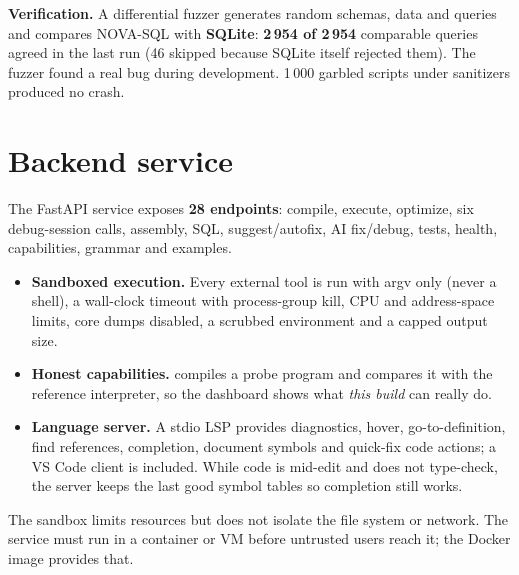 \documentclass[11pt,a4paper]{article}
\begin{document}
\textbf{Verification.} A differential fuzzer generates random schemas, data and queries and compares NOVA-SQL with \textbf{SQLite}: \textbf{2\,954 of 2\,954} comparable queries agreed in the last run (46 skipped because SQLite itself rejected them). The fuzzer found a real bug during development. 1\,000 garbled scripts under sanitizers produced no crash.

\section{Backend service}
The FastAPI service exposes \textbf{28 endpoints}: compile, execute, optimize, six debug-session calls, assembly, SQL, suggest/autofix, AI fix/debug, tests, health, capabilities, grammar and examples.
\begin{itemize}
\item \textbf{Sandboxed execution.} Every external tool is run with argv only (never a shell), a wall-clock timeout with process-group kill, CPU and address-space limits, core dumps disabled, a scrubbed environment and a capped output size.
\item \textbf{Honest capabilities.}  compiles a probe program and compares it with the reference interpreter, so the dashboard shows what \emph{this build} can really do.
\item \textbf{Language server.} A stdio LSP provides diagnostics, hover, go-to-definition, find references, completion, document symbols and quick-fix code actions; a VS Code client is included. While code is mid-edit and does not type-check, the server keeps the last good symbol tables so completion still works.
\end{itemize}
\begin{warn}
The sandbox limits resources but does not isolate the file system or network. The service must run in a container or VM before untrusted users reach it; the Docker image provides that.
\end{warn}

\end{document}
